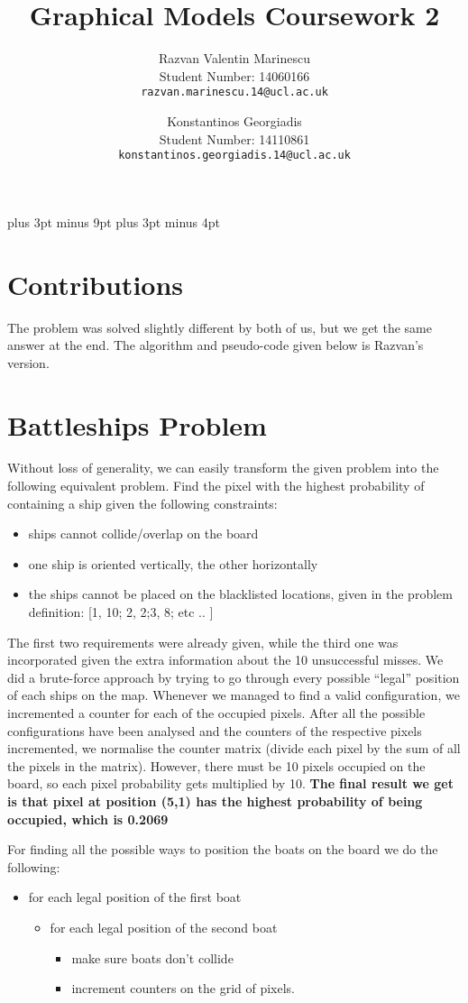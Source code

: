 \documentclass[11pt,a4paper,oneside]{report}
\title{Graphical Models Coursework 2}
\author{
    Razvan Valentin Marinescu\\
    Student Number: 14060166\\
  \texttt{razvan.marinescu.14@ucl.ac.uk}
  \and
    Konstantinos Georgiadis\\
    Student Number: 14110861\\
  \texttt{konstantinos.georgiadis.14@ucl.ac.uk}
}
\begin{document}
\belowdisplayskip=12pt plus 3pt minus 9pt
\belowdisplayshortskip=7pt plus 3pt minus 4pt

\maketitle{}

\section*{Contributions}

The problem was solved slightly different by both of us, but we get the same answer at the end. The algorithm and pseudo-code given below is Razvan's version.

\section*{Battleships Problem}

Without loss of generality, we can easily transform the given problem into the following equivalent problem. Find the pixel with the highest probability of containing a ship given the following constraints: 
\begin{itemize}
 \item ships cannot collide/overlap on the board
 \item one ship is oriented vertically, the other horizontally
 \item the ships cannot be placed on the blacklisted locations, given in the problem definition: [1, 10; 2, 2;3, 8; etc .. ]
\end{itemize}

The first two requirements were already given, while the third one was incorporated given the extra information about the 10 unsuccessful misses. We did a brute-force approach by trying to go through every possible “legal” position of each ships on the map. Whenever we managed to find a valid configuration, we incremented a counter for each of the occupied pixels. After all the possible configurations have been analysed and the counters of the respective pixels incremented, we normalise the counter matrix (divide each pixel by the sum of all the pixels in the matrix). However, there must be 10 pixels occupied on the board, so each pixel probability gets multiplied by 10. \textbf{The final result we get is that pixel at position (5,1) has the highest probability of being occupied, which is 0.2069}

For finding all the possible ways to position the boats on the board we do the following:
\begin{itemize}
 \item for each legal position of the first boat
  \begin{itemize}
  \item for each legal position of the second boat
      \begin{itemize}
      \item make sure boats don't collide
      \item increment counters on the grid of pixels.
      \end{itemize}
  \end{itemize}
\end{itemize}
\end{document}
